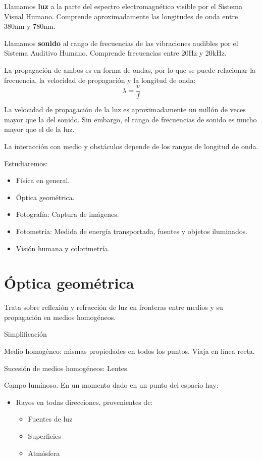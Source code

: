 \documentclass[a4paper]{book}
\begin{document}
Llamamos \textbf{luz} a la parte del espectro electromagnético visible por el Sistema Visual Humano. Comprende aproximadamente las longitudes de onda entre 380nm y 780nm.

Llamamos \textbf{sonido} al rango de frecuencias de las vibraciones audibles por el Sistema Auditivo Humano. Comprende frecuencias entre 20Hz y 20kHz.

La propagación de ambos es en forma de ondas, por lo que se puede relacionar la frecuencia, la velocidad de propagación y la longitud de onda:
\[ \lambda = \frac{v}{f}  \]

La velocidad de propagación de la luz es aproximadamente un millón de veces mayor que la del sonido. Sin embargo, el rango de frecuencias de sonido es mucho mayor que el de la luz.

La interacción con medio y obstáculos depende de los rangos de longitud de onda.

Estudiaremos:
\begin{itemize}
	\item Física en general.
	\item Óptica geométrica.
	\item Fotografía: Captura de imágenes.
	\item Fotometría: Medida de energía transportada, fuentes y objetos iluminados.
	\item Visión humana y colorimetría.
\end{itemize}

\section{Óptica geométrica}

Trata sobre reflexión y refracción de luz en fronteras entre medios y su propagación en medios homogéneos.

Simplificación

Medio homogéneo: mismas propiedades en todos los puntos. Viaja en línea recta.

Sucesión de medios homogéneos: Lentes.

Campo luminoso. En un momento dado en un punto del espacio hay:
\begin{itemize}
	\item Rayos en todas direcciones, provenientes de:
	      \begin{itemize}
		      \item Fuentes de luz
		      \item Superficies
		      \item Atmósfera
	      \end{itemize}
\end{itemize}
\end{document}
